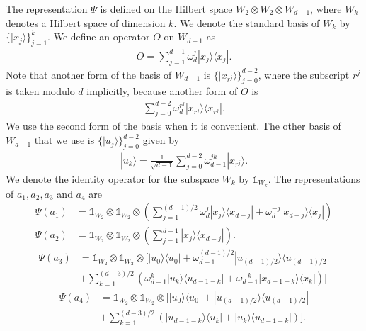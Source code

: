 \documentclass[11pt,letterpaper]{article}
\newcommand{\ket}[1]{|#1\rangle}
\newcommand{\ketbra}[2]{|#1\rangle\langle#2|}
\newcommand{\x}{\otimes}
\newcommand{\1}{\mathbb{1}}
\theoremstyle{definition}
\begin{document}
The representation $\Psi$ is defined on the Hilbert space
$W_2 \x W_2 \x W_{d-1}$,
where $W_k$ denotes a Hilbert space of
dimension $k$.  We denote the
standard basis of $W_k$ by $\{\ket{x_j}\}_{j=1}^{k}$.
We define an operator $O$ on $W_{d-1}$ as
\begin{align*}
    O = \sum_{j=1}^{d-1} \omega_d^j \ketbra{x_j}{x_j}.
\end{align*}
Note that another form of the basis of $W_{d-1}$ is $\{\ket{x_{r^j}}\}_{j=0}^{d-2}$, where the subscript $r^j$ is taken
modulo $d$ implicitly,
because another form of $O$ is 
\begin{align}
    \label{eq:O}
    \sum_{j=0}^{d-2} \omega_d^{r^j} \ketbra{x_{r^j}}{x_{r^j}}.
\end{align}
We use the second form of the basis when it is convenient.
The other basis of $W_{d-1}$ that we use is $\{ \ket{u_j} \}_{j=0}^{d-2}$ given by
\begin{align*}
	\ket{u_k} = \frac{1}{\sqrt{d-1}} \sum_{j=0}^{d-2} \omega_{d-1}^{jk} \ket{x_{r^j}}.
\end{align*}
We denote the identity operator for the subspace $W_k$ by $\1_{W_k}$.
The representations of $a_1, a_2, a_3$ and
$a_4$ are 
\begin{align}
    \label{eq:o1} \Psi(a_1) &= \1_{W_2} \x \1_{W_2} \x \left(\sum_{j=1}^{(d-1)/2} \omega_d^j \ketbra{x_j}{x_{d-j}} + \omega_d^{-j} \ketbra{x_{d-j}}{x_{j}}\right) \\
    \label{eq:o2} \Psi(a_2) &= \1_{W_2} \x \1_{W_2} \x \left(\sum_{j=1}^{d-1} \ketbra{x_j}{x_{d-j}} \right).
\end{align}
\begin{equation}
    \begin{aligned}
    \label{eq:u1} \Psi(a_3) &= \1_{W_2} \x \1_{W_2} \x \Big[\ketbra{u_0}{u_0} +\omega_{d-1}^{(d-1)/2}\ketbra{u_{(d-1)/2}}{u_{(d-1)/2}}\\ 
    &+ \sum_{k=1}^{(d-3)/2}\left( \omega_{d-1}^k\ketbra{u_k}{u_{d-1-k}} + \omega_{d-1}^{-k}\ketbra{x_{d-1-k}}{x_k}\right) \Big]
    \end{aligned}
\end{equation}
\begin{equation}
    \begin{aligned}
    \label{eq:u2}\Psi(a_4) &= \1_{W_2} \x \1_{W_2} \x \Big[\ketbra{u_0}{u_0} +\ketbra{u_{(d-1)/2}}{u_{(d-1)/2}} \\
	& + \sum_{k=1}^{(d-3)/2}\left(\ketbra{u_{d-1-k}}{u_k} + \ketbra{u_k}{u_{d-1-k}}\right)\Big].
    \end{aligned}
\end{equation}
\end{document}
